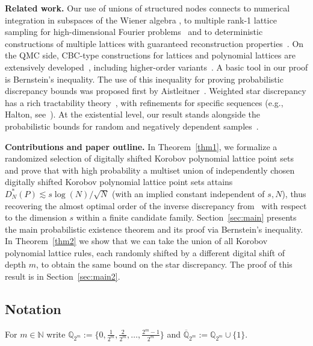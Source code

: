 \documentclass[12pt]{article}
\theoremstyle{definition}
\numberwithin{equation}{section}
\begin{document}
\medskip
\noindent\textbf{Related work.}
Our use of unions of structured nodes connects to numerical integration in subspaces of the Wiener algebra \cite{D14,DGS25,G23}, to multiple rank-1 lattice sampling for high-dimensional Fourier problems~\cite{Kaemmerer18,KPV21} and to deterministic constructions of multiple lattices with guaranteed reconstruction properties~\cite{GIWV20}. On the QMC side, CBC-type constructions for lattices and polynomial lattices are extensively developed~\cite{DKLP07,DKLS05,NC06a,NC06b}, including higher-order variants~\cite{Baldeaux2011}. A basic tool in our proof is Bernstein's inequality. The use of this inequality for proving probabilistic discrepancy bounds was proposed first by Aistleitner~\cite{Ai11}. Weighted star discrepancy has a rich tractability theory~\cite{Aistleitner2014weights,DKP10,HPS08}, with refinements for specific sequences (e.g., Halton, see~\cite{HinrichsMarkhasinHalton}). At the existential level, our result stands alongside the probabilistic bounds for random and negatively dependent samples~\cite{AH14,DoerrJittered,DGKP08,DGW10,GPW,Lobbe14,NP,WGH20}.

\medskip
\noindent\textbf{Contributions and paper outline.}
In Theorem~\ref{thm1}, we formalize a randomized selection of digitally shifted Korobov polynomial lattice point sets and prove that with high probability a multiset union of independently chosen digitally shifted Korobov polynomial lattice point sets attains $D^*_N(P)\lesssim s \log(N)/\sqrt{N}$ (with an implied constant independent of $s,N$), thus recovering the almost optimal order of the inverse discrepancy from~\cite{HNWW01} with respect to the dimension $s$ within a finite candidate family. 
Section~\ref{sec:main} presents the main probabilistic existence theorem and its proof via Bernstein's inequality. In Theorem~\ref{thm2} we show that we can take the union of all Korobov polynomial lattice rules, each randomly shifted by a different digital shift of depth $m$, to obtain the same bound on the star discrepancy. The proof of this result is in Section~\ref{sec:main2}.




\subsection{Notation}

For $m \in \mathbb{N}$ write $\mathbb{Q}_{2^m}:=\{0,\tfrac{1}{2^m},\tfrac{2}{2^m},\ldots,\tfrac{2^m-1}{2^m}\}$ and $\overline{\mathbb{Q}}_{2^m}:=\mathbb{Q}_{2^m} \cup \{1\}$. 
\end{document}
